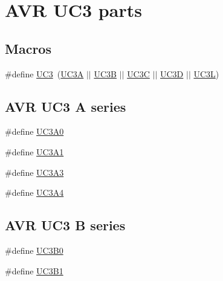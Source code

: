 \hypertarget{group__uc3__part__macros__group}{\section{A\-V\-R U\-C3 parts}
\label{group__uc3__part__macros__group}
}
\subsection*{Macros}
\begin{DoxyCompactItemize}
\item 
\#define \hyperlink{group__uc3__part__macros__group_ga848d950beec67bc702bfcfdecc70bb5b}{U\-C3}~(\hyperlink{group__uc3__part__macros__group_gaf7f16cc2bde7daf34576983fee8824c8}{U\-C3\-A} $|$$|$ \hyperlink{group__uc3__part__macros__group_ga61e51606324c212eb11079e5acf592e0}{U\-C3\-B} $|$$|$ \hyperlink{group__uc3__part__macros__group_gac7a13b9ceb67804d94b6a8967512ee71}{U\-C3\-C} $|$$|$ \hyperlink{group__uc3__part__macros__group_ga351a876f40669641e6ba9620909143d3}{U\-C3\-D} $|$$|$ \hyperlink{group__uc3__part__macros__group_gac8a7d715e500aa74cd05e0f0fc5bb005}{U\-C3\-L})
\end{DoxyCompactItemize}
\subsection*{A\-V\-R U\-C3 A series}
\begin{DoxyCompactItemize}
\item 
\#define \hyperlink{group__uc3__part__macros__group_gaee4dd9ce50cc26707d159660db9fc408}{U\-C3\-A0}
\item 
\#define \hyperlink{group__uc3__part__macros__group_gacbe47eb7ac7d6e655d45657bffab3af6}{U\-C3\-A1}
\item 
\#define \hyperlink{group__uc3__part__macros__group_gae08aa32db9bd4a60a8cfa222f7ff74cc}{U\-C3\-A3}
\item 
\#define \hyperlink{group__uc3__part__macros__group_ga633294c4776386c15ab2050644e77b4f}{U\-C3\-A4}
\end{DoxyCompactItemize}
\subsection*{A\-V\-R U\-C3 B series}
\begin{DoxyCompactItemize}
\item 
\#define \hyperlink{group__uc3__part__macros__group_ga701194230718f73a89efc39742e061af}{U\-C3\-B0}
\item 
\#define \hyperlink{group__uc3__part__macros__group_ga96602eec1c923afe92a64d807a242cd7}{U\-C3\-B1}
\end{DoxyCompactItemize}
